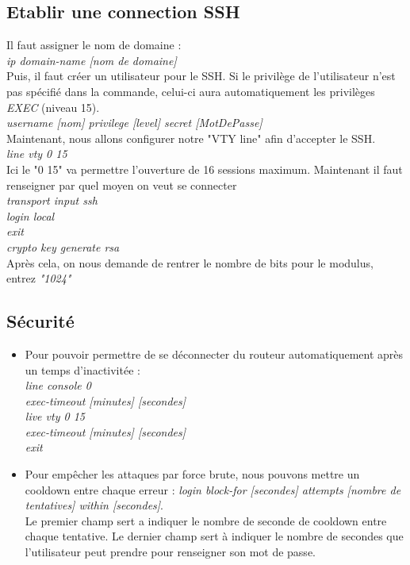 \documentclass[a4paper]{article}
\begin{document}
\subsection{Etablir une connection SSH}
Il faut assigner le nom de domaine : \\
\emph{ip domain-name [nom de domaine]}\\
Puis, il faut créer un utilisateur pour le SSH. Si le privilège de l'utilisateur n'est pas spécifié dans la commande,
celui-ci aura automatiquement les privilèges \emph{EXEC} (niveau 15).\\
\emph{username [nom] privilege [level] secret [MotDePasse]}\\
Maintenant, nous allons configurer notre "VTY line" afin d'accepter le SSH.\\
\emph{line vty 0 15}\\
Ici le "0 15" va permettre l'ouverture de 16 sessions maximum.
Maintenant il faut renseigner par quel moyen on veut se connecter\\
\emph{transport input ssh}\\
\emph{login local}\\
\emph{exit}\\
\emph{crypto key generate rsa}\\
Après cela, on nous demande de rentrer le nombre de bits pour le modulus, entrez \emph{"1024"}\\

\subsection{Sécurité}
\begin{itemize}
  \item Pour pouvoir permettre de se déconnecter du routeur automatiquement après un temps d'inactivitée :\\
  \emph{line console 0}\\
  \emph{exec-timeout [minutes] [secondes]}\\
  \emph{live vty 0 15}\\
  \emph{exec-timeout [minutes] [secondes]}\\
  \emph{exit}
  \item Pour empêcher les attaques par force brute, nous pouvons mettre un cooldown entre chaque erreur : \emph{login block-for [secondes] attempts [nombre de tentatives] within [secondes]}.\\
  Le premier champ sert a indiquer le nombre de seconde de cooldown entre chaque tentative. Le dernier champ sert à indiquer le nombre de secondes que l'utilisateur peut prendre pour renseigner son mot de passe.
\end{itemize}
\end{document}
